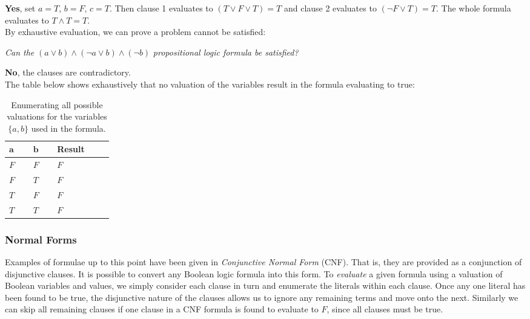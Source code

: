 \documentclass[a4paper,openany,12pt]{book}
\begin{document}
\textcolor{id7-emerald-green}{\textbf{Yes}}, set $a = T$, $b=F$, $c=T$.
Then clause 1 evaluates to $(T \lor F \lor T) = T$ and clause 2 evaluates to $(\neg F \lor T) = T$.
The whole formula evaluates to $T \land T = T$.\\

By exhaustive evaluation, we can prove a problem cannot be satisfied:

\emph{Can the} \(
    (a \lor b) \land (\neg a \lor b) \land (\neg b)
\) \emph{propositional logic formula be satisfied?}

\textcolor{id7-ruby-red}{\textbf{No}}, the clauses are contradictory.\\
The table below shows exhaustively that no valuation of the variables result in the formula evaluating to true:

\def\arraystretch{1.5}%
\begin{table}[H]
    \centering
    \begin{tabular}[t]{|p{0.05\linewidth}|p{0.05\linewidth}|p{0.1\linewidth}|}
        \hline
        \rowcolor{id7-aubergine}
        {\color[HTML]{FFFFFF} $\mathbf{a}$} & {\color[HTML]{FFFFFF} $\mathbf{b}$} & {\color[HTML]{FFFFFF} \sffamily  \textbf{Result}} \\ \hline
        $F$ & $F$ & $F$  \\ \hline
        $F$ & $T$ & $F$  \\ \hline
        $T$ & $F$ & $F$  \\ \hline
        $T$ & $T$ & $F$  \\ \hline
    \end{tabular}
    \caption{Enumerating all possible valuations for the variables $\{a, b\}$ used in the formula.}
    \label{table:landingredesign}
\end{table}

\subsubsection{Normal Forms}

Examples of formulae up to this point have been given in \emph{Conjunctive Normal Form} (CNF).
That is, they are provided as a conjunction of disjunctive clauses.
It is possible to convert any Boolean logic formula into this form.
To \emph{evaluate} a given formula using a valuation of Boolean variables and values, we simply consider each clause in
turn and enumerate the literals within each clause.
Once any one literal has been found to be true, the disjunctive nature of the clauses allows us to ignore any remaining
terms and move onto the next.
Similarly we can skip all remaining clauses if one clause in a CNF formula is found to evaluate to $F$, since all
clauses must be true.
\end{document}
